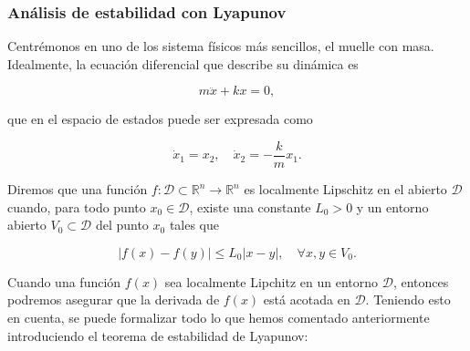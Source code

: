 \subsubsection{Análisis de estabilidad con Lyapunov}



Centrémonos en uno de los sistema físicos más sencillos, el muelle con masa. Idealmente, la ecuación diferencial que describe su dinámica es

$$m \ddot x + kx = 0,$$

que en el espacio de estados puede ser expresada como

$$\dot x_1 = x_2, \quad \dot x_2 = - \frac{k}{m}x_1.$$



\begin{definition}
Diremos que una función $f : \mathcal{D} \subset \mathds{R}^n \rightarrow \mathds{R}^n$ es localmente Lipschitz en el abierto $\mathcal{D}$ cuando, para todo punto $x_0 \in \mathcal{D}$, existe una constante $L_0 > 0$ y un entorno abierto $V_0 \subset \mathcal{D}$ del punto $x_0$ tales que

$$|f(x) - f(y)| \leq L_0 |x-y|, \quad \forall x,y \in V_0.$$
\end{definition}

Cuando una función $f(x)$ sea localmente Lipchitz en un entorno $\mathcal{D}$, entonces podremos asegurar que la derivada de $f(x)$ está acotada en $\mathcal{D}$. Teniendo esto en cuenta, se puede formalizar todo lo que hemos comentado anteriormente introduciendo el teorema de estabilidad de Lyapunov:

